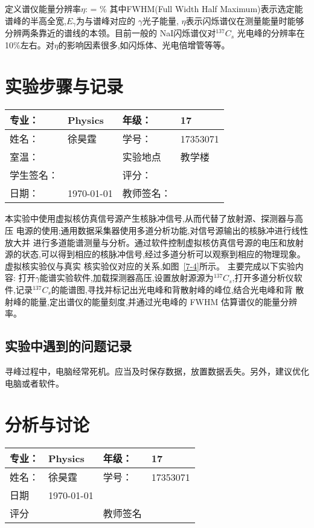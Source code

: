 \documentclass[11pt,a4paper]{ctexart}
\begin{document}
定义谱仪能量分辨率$\eta$:
\beq
\eta = \%
\eeq
其中FWHM(Full Width Half Maximum)表示选定能谱峰的半高全宽,$E_\gamma$为与谱峰对应的
$\gamma$光子能量, $\eta$表示闪烁谱仪在测量能量时能够分辨两条靠近的谱线的本领。目前一般的 NaI闪烁谱仪对$^{137}C_s$ 光电峰的分辨率在 10\%左右。对$\eta$的影响因素很多,如闪烁体、光电倍增管等等。
\newpage
\section{实验步骤与记录}
\begin{tabular}{|p{8em}|p{8em}|p{8em}|p{8em}|}
	\hline 
	专业：     &Physics       &年级：      & 17     \\
	\hline
	姓名：& 徐昊霆 &学号：&17353071  \\
	\hline
	室温：&                    &实验地点 & 教学楼 \\
	\hline	
	学生签名： & & 评分： & \\
	\hline
	日期： & \today & 教师签名：&  \\
	\hline
\end{tabular}

本实验中使用虚拟核仿真信号源产生核脉冲信号,从而代替了放射源、探测器与高压
电源的使用;通用数据采集器使用多道分析功能,对信号源输出的核脉冲进行线性放大并
进行多道能谱测量与分析。通过软件控制虚拟核仿真信号源的电压和放射源的状态,可以得到相应的核脉冲信号,经过多道分析可以观察到相应的物理现象。虚拟核实验仪与真实
核实验仪对应的关系,如图~\ref{7-4}所示。
主要完成以下实验内容:
打开$\gamma$能谱实验软件,加载探测器高压,设置放射源源为$^{137}C_s$,打开多道分析仪软
件,记录$^{137}C_s$的能谱图,寻找并标记出光电峰和背散射峰的峰位,结合光电峰和背
散射峰的能量,定出谱仪的能量刻度,并通过光电峰的 FWHM 估算谱仪的能量分辨
率。

    
\subsection{实验中遇到的问题记录}
{\color{red} 寻峰过程中，电脑经常死机。应当及时保存数据，放置数据丢失。另外，建议优化电脑或者软件。}


\newpage
\section{分析与讨论}
\begin{tabular}{|p{7em}|p{7em}|p{7em}|p{7em}|}
	\hline 
	专业：     &Physics       &年级：      & 17     \\
	\hline
	姓名：& 徐昊霆 &学号：&17353071  \\
	\hline
	日期&  \today              & &  \\
	\hline	
	评分 & & 教师签名 & \\
	\hline
\end{tabular}
\end{document}
